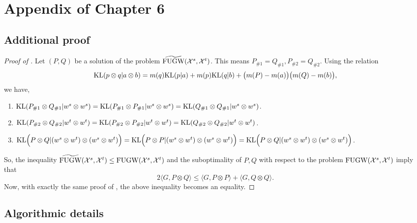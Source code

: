 \section{Appendix of Chapter 6}

\subsection{Additional proof}

\begin{proof}[Proof of ]
  Let $(P, Q)$ be a solution of the problem $\widetilde{\text{FUGW}}(\mathcal X^s, \mathcal X^t)$.
  This means $P_{\#1} = Q_{\#1}, P_{\#2} = Q_{\#2}$. Using the relation
  \begin{align}
    \text{KL}(p \otimes q | a \otimes b) = m(q) \text{KL}(p | a) + m(p) \text{KL}(q | b)
    + \big(m(P) - m(a)\big) \big(m(Q) - m(b)\big),
  \end{align}
  we have,
  \begin{enumerate}
    \item $\text{KL}(P_{\#1} \otimes Q_{\#1} \vert w^s \otimes w^s) =
    \text{KL}(P_{\#1} \otimes P_{\#1} \vert w^s \otimes w^s) =
    \text{KL}(Q_{\#1} \otimes Q_{\#1} \vert w^s \otimes w^s)$.

    \item $\text{KL}(P_{\#2} \otimes Q_{\#2} \vert w^t \otimes w^t) =
  \text{KL}(P_{\#2} \otimes P_{\#2} \vert w^t \otimes w^t) =
  \text{KL}(Q_{\#2} \otimes Q_{\#2} \vert w^t \otimes w^t)$.

    \item $\text{KL} \Big(P \otimes Q | (w^s \otimes w^t) \otimes (w^s \otimes w^t) \Big) =
    \text{KL} \Big(P \otimes P | (w^s \otimes w^t) \otimes (w^s \otimes w^t) \Big)
    = \text{KL} \Big(P \otimes Q | (w^s \otimes w^t) \otimes (w^s \otimes w^t) \Big)$.
  \end{enumerate}
  So, the inequality $\widetilde{\text{FUGW}}(\mathcal X^s, \mathcal X^t) \leq \text{FUGW}(\mathcal X^s, \mathcal X^t)$ and
  the suboptimality of $P, Q$ with respect to the problem $\text{FUGW}(\mathcal X^s, \mathcal X^t)$ imply that
  \begin{equation}
    2 \langle G, P \otimes Q \rangle \leq
      \langle G, P \otimes P \rangle + \langle G, Q \otimes Q \rangle.
  \end{equation}
  Now, with exactly the same proof of ,
  the above inequality becomes an equality.
\end{proof}

\subsection{Algorithmic details}

